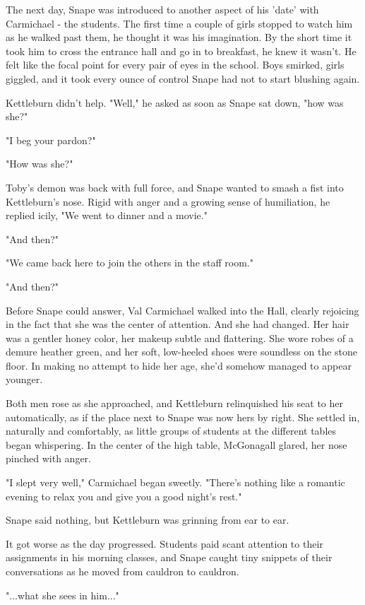 \documentclass[a4paper,11pt]{article}
\begin{document}
The next day, Snape was introduced to another aspect of his 'date' with Carmichael - the students. The first time a couple of girls stopped to watch him as he walked past them, he thought it was his imagination. By the short time it took him to cross the entrance hall and go in to breakfast, he knew it wasn't. He felt like the focal point for every pair of eyes in the school. Boys smirked, girls giggled, and it took every ounce of control Snape had not to start blushing again.

Kettleburn didn't help. "Well," he asked as soon as Snape sat down, "how was she?"

"I beg your pardon?"

"How was she?"

Toby's demon was back with full force, and Snape wanted to smash a fist into Kettleburn's nose. Rigid with anger and a growing sense of humiliation, he replied icily, "We went to dinner and a movie."

"And then?"

"We came back here to join the others in the staff room."

"And then?"

Before Snape could answer, Val Carmichael walked into the Hall, clearly rejoicing in the fact that she was the center of attention. And she had changed. Her hair was a gentler honey color, her makeup subtle and flattering. She wore robes of a demure heather green, and her soft, low-heeled shoes were soundless on the stone floor. In making no attempt to hide her age, she'd somehow managed to appear younger.

Both men rose as she approached, and Kettleburn relinquished his seat to her automatically, as if the place next to Snape was now hers by right. She settled in, naturally and comfortably, as little groups of students at the different tables began whispering. In the center of the high table, McGonagall glared, her nose pinched with anger.

"I slept very well," Carmichael began sweetly. "There's nothing like a romantic evening to relax you and give you a good night's rest."

Snape said nothing, but Kettleburn was grinning from ear to ear.

It got worse as the day progressed. Students paid scant attention to their assignments in his morning classes, and Snape caught tiny snippets of their conversations as he moved from cauldron to cauldron.

"...what she sees in him..."
\end{document}

